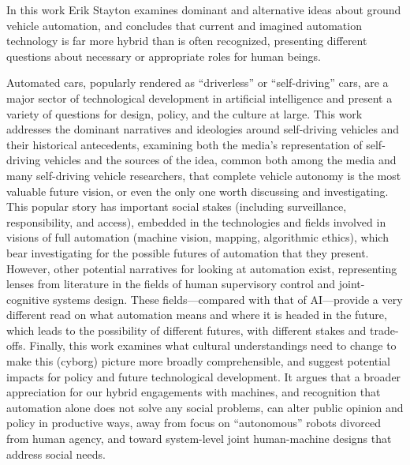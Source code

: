 % 
% 
%

In this work Erik Stayton examines dominant and alternative ideas about ground
vehicle automation, and concludes that current and imagined automation
technology is far more hybrid than 
is often recognized, presenting different questions about necessary or
appropriate roles for human beings.

Automated cars, popularly rendered as ``driverless'' or
``self-driving'' cars, are a major sector of technological
development in artificial intelligence and present a variety of
questions for design, policy, and the culture at large. This work addresses the
dominant narratives and ideologies around self-driving 
vehicles and their historical antecedents, examining both the media's representation
of self-driving vehicles and 
the sources of the idea, common both among the media and many
self-driving vehicle researchers, that complete vehicle autonomy is
the most valuable future vision, or even the only one  worth
discussing and investigating. 
This popular story has important social stakes (including
surveillance, responsibility, and access), embedded in the
technologies and fields involved in visions of full
automation (machine vision, mapping, algorithmic ethics), which bear investigating
for the possible futures of 
automation that they present.
However, other potential narratives for looking at automation exist,
representing lenses from
literature in the fields of human supervisory control and
joint-cognitive systems design. These fields---compared with
that of AI---provide a very
different read on what automation means and where it is headed in the
future, which leads to the possibility of different futures, with
different stakes and trade-offs. Finally, this work examines what cultural
understandings need to change to 
make this (cyborg) picture more broadly comprehensible, and suggest potential
impacts for policy and future technological development. It argues that
a broader appreciation for 
our hybrid engagements with machines, and recognition that automation
alone does not solve any social problems, can alter public
opinion and policy in productive ways, away from focus on
``autonomous'' robots divorced from human agency, and toward
system-level joint human-machine designs that address social needs. 
